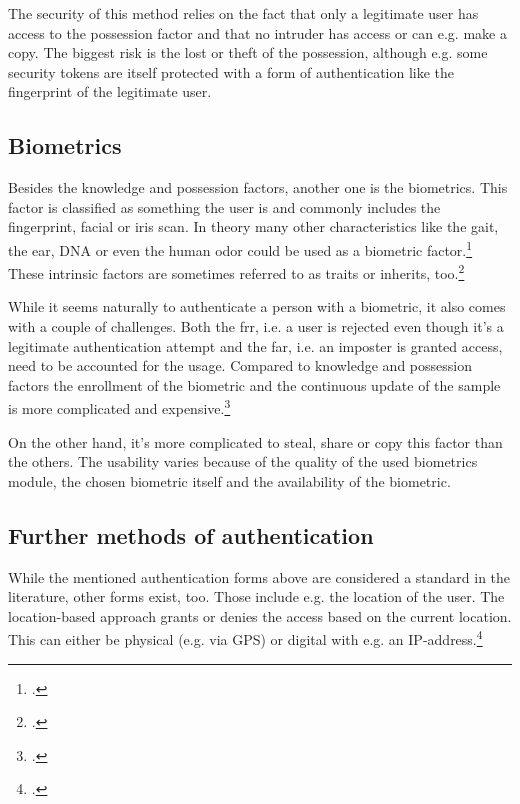 The security of this method relies on the fact that only a legitimate user has access to the possession factor and that no intruder has access or can e.g. make a copy. The biggest risk is the lost or theft of the possession, although e.g. some security tokens are itself protected with a form of authentication like the fingerprint of the legitimate user.

\subsection{Biometrics}

Besides the knowledge and possession factors, another one is the biometrics. This factor is classified as \frqq something the user is\flqq{} and commonly includes the fingerprint, facial or iris scan. In theory many other characteristics like the gait, the ear, DNA or even the human odor could be used as a biometric factor.\footcite[See][30--34]{Jain2011}\\
These intrinsic factors are sometimes referred to as traits or inherits, too.\footcite[See][186]{dasgupta2017multi}

While it seems naturally to authenticate a person with a biometric, it also comes with a couple of challenges. Both the \gls{frr}, i.e. a user is rejected even though it's a legitimate authentication attempt and the \gls{far}, i.e. an imposter is granted access, need to be accounted for the usage. Compared to knowledge and possession factors the enrollment of the biometric and the continuous update of the sample is more complicated and expensive.\footcite[See][18--24]{Jain2011}

On the other hand, it's more complicated to steal, share or copy this factor than the others. The usability varies because of the quality of the used biometrics module, the chosen biometric itself and the availability of the biometric.

\subsection{Further methods of authentication}

While the mentioned authentication forms above are considered a standard in the literature, other forms exist, too. Those include e.g. the location of the user. The location-based approach grants or denies the access based on the current location. This can either be physical (e.g. via GPS) or digital with e.g. an IP-address.\footcite{6296127}

